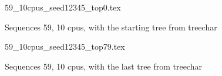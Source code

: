 \documentclass[12pt,a4paper]{article}
\begin{document}
\begin{figure}
\caption*{Sequences 59, 10 cpus, with the starting tree from treechar}
{59_10cpus_seed12345_top0.tex}
\end{figure}
 
\begin{figure}
\caption*{Sequences 59, 10 cpus, with the last tree from treechar}
{59_10cpus_seed12345_top79.tex}
\end{figure}
\end{document}
